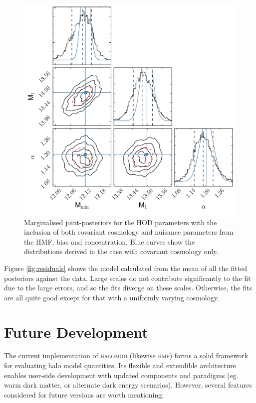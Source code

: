 \documentclass[5p]{elsarticle}
\begin{document}
 \begin{figure}
\centering
\includegraphics[width=\linewidth]{figures/with_nuisance_triangle.pdf} 
\caption[Marginalised joint-posteriors for the HOD parameters with the inclusion of both covariant cosmology and nuisance parameters from the HMF, bias and concentration]{Marginalised joint-posteriors for the HOD parameters with the inclusion of both covariant cosmology and nuisance parameters from the HMF, bias and concentration. Blue curves show the distributions derived in the case with covariant cosmology only.}
\label{fig:nuisance}
\end{figure}

Figure \ref{fig:residuals} shows the model calculated from the mean of all the fitted posteriors against the data. Large scales do not contribute significantly to the fit due to the large errors, and so the fits diverge on these scales. Otherwise, the fits are all quite good except for that with a uniformly varying cosmology. 

\section{Future Development}
\label{sec:future}
The current implementation of \textsc{halomod} (likewise \textsc{hmf}) forms a solid framework for evaluating halo model quantities. Its flexible and extendible architecture enables user-side development with updated components and paradigms (eg. warm dark matter, or alternate dark energy scenarios). However, several features considered for future versions are worth mentioning:
\end{document}
